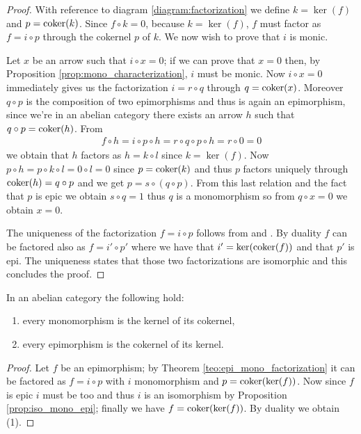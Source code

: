 \begin{proof}
  With reference to diagram \ref{diagram:factorization} we define \(k = \ker(f)\) and \(p = \operatorname{coker}(k)\). Since \(f\circ k = 0\), because \(k = \ker(f)\), \(f\) must factor as \(f = i\circ p\) through the cokernel \(p\) of \(k\). We now wish to prove that \(i\) is monic.

  Let \(x\) be an arrow such that \(i\circ x = 0\); if we can prove that \(x = 0\) then, by Proposition \ref{prop:mono_characterization}, \(i\) must be monic. Now \(i\circ x = 0\) immediately gives us the factorization \(i = r\circ q\) through \(q = \operatorname{coker}(x)\). Moreover \(q\circ p\) is the composition of two epimorphisms and thus is again an epimorphism, since we're in an abelian category there exists an arrow \(h\) such that \(q\circ p = \operatorname{coker}(h)\). From
  \begin{align*}
    f\circ h = i\circ p\circ h = r\circ q\circ p\circ h = r\circ 0 = 0
  \end{align*}
  we obtain that \(h\) factors as \(h = k\circ l\) since \(k = \ker(f)\). Now \(p\circ h = p\circ k\circ l = 0\circ l = 0\) since \(p=\operatorname{coker}(k)\) and thus \(p\) factors uniquely through \(\operatorname{coker}(h) = q\circ p\) and we get \(p = s\circ(q\circ p)\). From this last relation and the fact that \(p\) is epic we obtain \(s\circ q = 1\) thus \(q\) is a monomorphism so from \(q\circ x = 0\) we obtain \(x = 0\).

  The uniqueness of the factorization \(f = i\circ p\) follows from \cite[4.4.5]{handbook1} and \cite[4.3.6]{handbook1}. By duality \(f\) can be factored also as \(f = i'\circ p'\) where we have that \(i' = \ker(\operatorname{coker}(f))\) and that \(p'\) is epi. The uniqueness states that those two factorizations are isomorphic and this concludes the proof.
\end{proof}

\begin{corollary}
  \label{cor:mono_kernel_cokernel_epi_cokernel_kernel}
  In an abelian category the following hold:
  \begin{enumerate}[label=(\arabic*)]
  \item every monomorphism is the kernel of its cokernel,
  \item every epimorphism is the cokernel of its kernel.  
  \end{enumerate}
\end{corollary}

\begin{proof}
  Let \(f\) be an epimorphism; by Theorem \ref{teo:epi_mono_factorization} it can be factored as \(f=i\circ p\) with \(i\) monomorphism and \(p = \operatorname{coker}(\ker(f))\). Now since \(f\) is epic \(i\) must be too and thus \(i\) is an isomorphism by Proposition \ref{prop:iso_mono_epi}; finally we have \(f= \operatorname{coker}(\ker(f))\). By duality we obtain (1). 
\end{proof}


